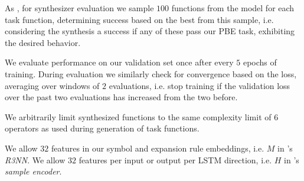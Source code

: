 \documentclass{article}
\begin{document}
As \citet{nsps}, for synthesizer evaluation we sample $100$ functions from the model for each task function,
determining success based on the best from this sample,
i.e. considering the synthesis a success if any of these pass our PBE task, exhibiting the desired behavior.

We evaluate performance on our validation set once after every $5$ epochs of training.
During evaluation we similarly check for convergence based on the loss,
averaging over windows of $2$ evaluations,
i.e. stop training if the validation loss over the past two evaluations has increased from the two before.


We arbitrarily limit synthesized functions to the same complexity limit of $6$ operators as used during generation of task functions.

We allow $32$ features in our symbol and expansion rule embeddings, i.e. $M$ in \citet{nsps}'s \emph{R3NN}.
We allow $32$ features per input or output per LSTM direction, i.e. $H$ in \citet{nsps}'s \emph{sample encoder}.
\end{document}
